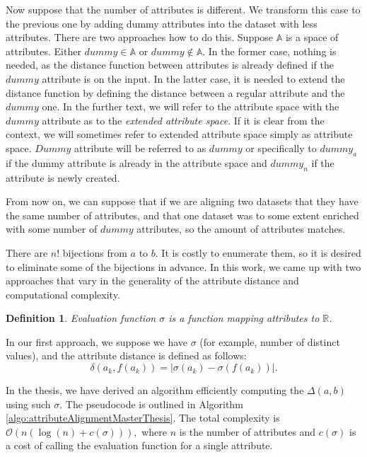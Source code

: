 \documentclass{article}
\newtheorem{definition}{Definition}
\newcommand{\attributeDistance}{\delta}
\newcommand{\globalDistance}{\Delta}
\newcommand{\dummy}{dummy}
\newcommand{\dummyoutside}{dummy_n}
\newcommand{\dummyinside}{dummy_a}
\begin{document}
\begin{refsegment}
Now suppose that the number of attributes is different. We transform this case to the previous one by adding dummy attributes into the dataset with less attributes. There are two approaches how to do this. Suppose $\mathbb{A}$ is a space of attributes. Either $dummy \in \mathbb{A}$ or $dummy \notin \mathbb{A}$. In the former case, nothing is needed, as the distance function between attributes is already defined if the $\dummy$ attribute is on the input. In the latter case, it is needed to extend the distance function by defining the distance between a regular attribute and the $\dummy$ one.
In the further text, we will refer to the attribute space with the $\dummy$ attribute as to the \emph{extended attribute space}. If it is clear from the context, we will sometimes refer to extended attribute space simply as attribute space. $Dummy$ attribute will be referred to as $\dummy$ or specifically to $\dummyinside$ if the dummy attribute is already in the attribute space and $\dummyoutside$ if the attribute is newly created.

From now on, we can suppose that if we are aligning two datasets that they have the same number of attributes, and that one dataset was to some extent enriched with some number of $\dummy$ attributes, so the amount of attributes matches.

 There are $n!$ bijections from $a$ to $b$. It is costly to enumerate them, so it is desired to eliminate some of the bijections in advance. In this work, we came up with two approaches that vary in the generality of the attribute distance and computational complexity.

\begin{definition}
	\emph{Evaluation function} $\sigma$ is a function mapping attributes to $\mathbb{R}$.
\end{definition}

In our first approach, we suppose we have $\sigma$ (for example, number of distinct values), and the attribute distance is defined as follows:
\begin{equation}
\attributeDistance(a_k, f(a_k))=|\sigma(a_k)-\sigma(f(a_k))|.
\label{eq:sigma}
\end{equation}

In the thesis, we have derived an algorithm efficiently computing the $\globalDistance(a,b)$ using such $\sigma$. The pseudocode is outlined in Algorithm \ref{algo:attributeAlignmentMasterThesis}. The total complexity is  $\mathcal{O}(n(\log(n)+c(\sigma))),$ where $n$ is the number of attributes and $c(\sigma)$ is a cost of calling the evaluation function for a single attribute.


\end{refsegment}
\end{document}
